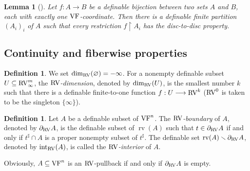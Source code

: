\documentclass[12pt]{amsart}
\newcommand{\memph}[1]{{\color{magenta}\emph{#1}}}
\theoremstyle{plain}
\newtheorem{lem}[thm]{Lemma}
\theoremstyle{definition}
\newtheorem{defn}[thm]{Definition}
\theoremstyle{remark}
\numberwithin{equation}{section}
\theoremstyle{plain}
\newcommand{\VF}{\textup{VF}}
\newcommand{\RV}{\textup{RV}}
\newcommand{\0}{\emptyset}
\newcommand{\rest}{\upharpoonright}
\newcommand{\fun}{\longrightarrow}
\newcommand{\sub}{\subseteq}
\newcommand{\mi}{\smallsetminus}
\DeclareMathOperator{\rv}{rv}
\DeclareMathOperator{\ito}{int}
\begin{document}
\begin{lem}[{\cite[Proposition~3.19]{Yin:int:acvf}}]\label{open:pro}
Let $f : A \fun B$ be a definable bijection between two sets $A$ and $B$, each with exactly one $\VF$-coordinate. Then there is a definable finite partition $(A_i)_i$ of $A$ such that every restriction $f \rest A_i$ has the disc-to-disc property.
\end{lem}


\subsection{Continuity and fiberwise properties}\label{sec:cont:fib:prop}

\begin{defn}
We set $\dim_{\RV}(\varnothing)=-\infty$. For a nonempty definable subset $U \sub \RV^m_\infty$, the \memph{$\RV$-dimension}, denoted by $\dim_{\RV}(U)$, is the smallest number $k$ such that there is a definable finite-to-one function $f: U \fun \RV^k$ ($\RV^0$ is taken to be the singleton $\{\infty\}$).
\end{defn}


\begin{defn}
Let $A$ be a definable subset of $\VF^n$. The \memph{$\RV$-boundary} of $A$, denoted by $\partial_{\RV}A$, is the definable subset of $\rv(A)$ such that $t \in \partial_{\RV} A$ if and only if $t^\sharp \cap A$ is a proper nonempty subset of $t^\sharp$. The definable set $\rv(A) \mi \partial_{\RV}A$, denoted by $\ito_{\RV}(A)$, is called the \memph{$\RV$-interior} of $A$.
\end{defn}


Obviously, $A \sub \VF^n$ is an $\RV$-pullback if and only if $\partial_{\RV} A$ is empty.
\end{document}
